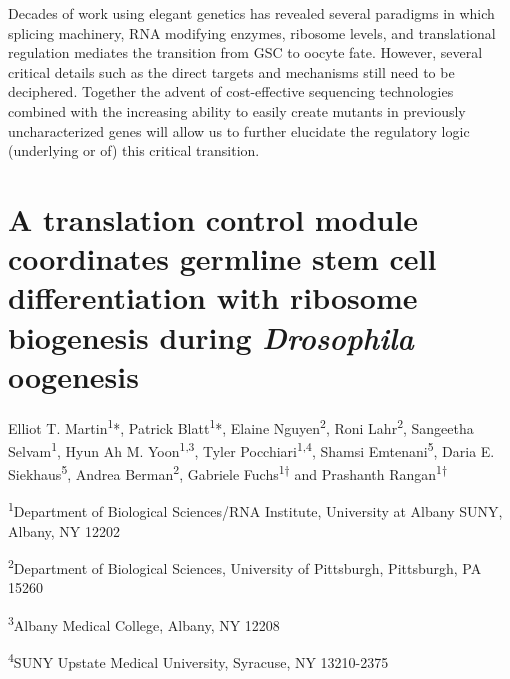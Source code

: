 \documentclass[12pt,oneside]{reedthesis}
\begin{document}
Decades of work using elegant genetics has revealed several paradigms in
which splicing machinery, RNA modifying enzymes, ribosome levels, and
translational regulation mediates the transition from GSC to oocyte
fate. However, several critical details such as the direct targets and
mechanisms still need to be deciphered. Together the advent of
cost-effective sequencing technologies combined with the increasing
ability to easily create mutants in previously uncharacterized genes
will allow us to further elucidate the regulatory logic (underlying or
of) this critical transition.
















\hypertarget{a-translation-control-module-coordinates-germline-stem-cell-differentiation-with-ribosome-biogenesis-during-drosophila-oogenesis}{%
\chapter{\texorpdfstring{A translation control module coordinates germline stem cell differentiation with ribosome biogenesis during \emph{Drosophila} oogenesis}{A translation control module coordinates germline stem cell differentiation with ribosome biogenesis during Drosophila oogenesis}}\label{a-translation-control-module-coordinates-germline-stem-cell-differentiation-with-ribosome-biogenesis-during-drosophila-oogenesis}}

Elliot T. Martin\textsuperscript{1}*, Patrick Blatt\textsuperscript{1}*, Elaine Nguyen\textsuperscript{2}, Roni
Lahr\textsuperscript{2}, Sangeetha Selvam\textsuperscript{1}, Hyun Ah M. Yoon\textsuperscript{1,3}, Tyler
Pocchiari\textsuperscript{1,4}, Shamsi Emtenani\textsuperscript{5}, Daria E. Siekhaus\textsuperscript{5}, Andrea
Berman\textsuperscript{2}, Gabriele Fuchs\textsuperscript{1†} and Prashanth Rangan\textsuperscript{1†}

\textsuperscript{1}Department of Biological Sciences/RNA Institute, University at Albany
SUNY, Albany, NY 12202

\textsuperscript{2}Department of Biological Sciences, University of Pittsburgh,
Pittsburgh, PA 15260

\textsuperscript{3}Albany Medical College, Albany, NY 12208

\textsuperscript{4}SUNY Upstate Medical University, Syracuse, NY 13210-2375
\end{document}
